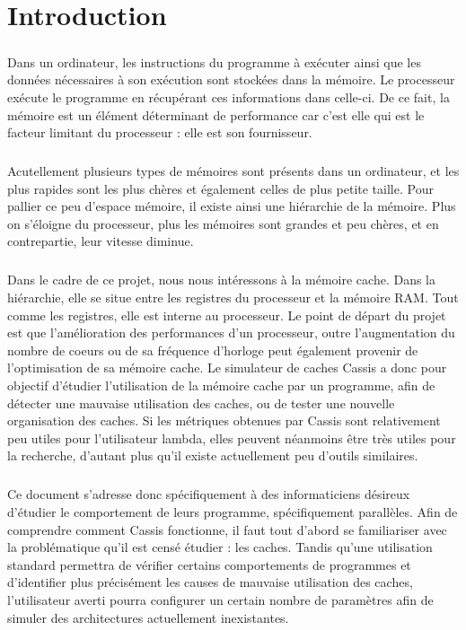 \chapter*{Introduction}

\paragraph{}
Dans un ordinateur, les instructions du programme à exécuter ainsi que les données nécessaires
à son exécution sont stockées dans la mémoire. Le processeur exécute le programme en récupérant ces informations dans celle-ci. De ce fait, la mémoire est un élément déterminant de performance car c'est elle qui est le facteur limitant du processeur : elle est son fournisseur.

\paragraph{}
Acutellement plusieurs types de mémoires sont présents dans un ordinateur, et les plus rapides sont les plus chères et également celles de plus petite taille.
Pour pallier ce peu d'espace mémoire, il existe ainsi une hiérarchie de la mémoire. Plus on s'éloigne du processeur, plus les mémoires sont grandes et peu chères, et en contrepartie, leur vitesse diminue. 

\paragraph{}
Dans le cadre de ce projet, nous nous intéressons à la mémoire cache. Dans la hiérarchie, elle se situe entre les registres du processeur et la mémoire RAM. Tout comme les registres, elle est interne au processeur.
Le point de départ du projet est que l'amélioration des performances d'un processeur, outre l'augmentation du nombre de coeurs ou de sa fréquence d'horloge peut également provenir de l'optimisation de sa mémoire cache. Le simulateur de caches \textsf{Cassis} a donc pour objectif d'étudier l'utilisation de la mémoire cache par un programme, afin de détecter une mauvaise utilisation des caches, ou de tester une nouvelle organisation des caches. Si les métriques obtenues par \textsf{Cassis} sont relativement peu utiles pour l'utilisateur lambda, elles peuvent néanmoins être très utiles pour la recherche, d'autant plus qu'il existe actuellement peu d'outils similaires.

\paragraph{}
Ce document s'adresse donc spécifiquement à des informaticiens désireux d'étudier le comportement de leurs programme, spécifiquement parallèles. Afin de comprendre comment \textsf{Cassis} fonctionne, il faut tout d'abord se familiariser avec la problématique qu'il est censé étudier : les caches. Tandis qu'une utilisation standard permettra de vérifier certains comportements de programmes et d'identifier plus précisément les causes de mauvaise utilisation des caches, l'utilisateur averti pourra configurer un certain nombre de paramètres afin de simuler des architectures actuellement inexistantes.
